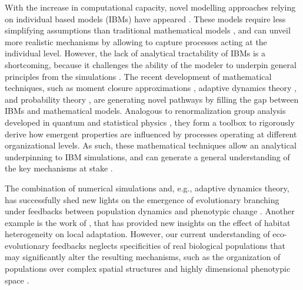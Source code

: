 With the increase in computational capacity, novel modelling approaches relying on individual based models (IBMs) have appeared \citep{deangelis2005individual}. These models require less simplifying assumptions than traditional mathematical models \citep{deangelis2005individual}, and can unveil more realistic mechanisms by allowing to capture processes acting at the individual level. However, the lack of analytical tractability of IBMs is a shortcoming, because it challenges the ability of the modeler to underpin general principles from the simulations \citep{Lion2016,May2004}.
% 
The recent development of mathematical techniques, such as moment closure approximations \citep{law1999moment,Gandhi2000,Nordbotten2020,Lion2016}, adaptive dynamics theory \citep{Metz1995}, and probability theory \citep{Champagnat2006}, are generating novel pathways by filling the gap between IBMs and mathematical models. 
% 
% 
Analogous to renormalization group analysis developed in quantum and statistical physics \citep{Sayama}, they form a toolbox to rigorously derive how emergent properties are influenced by processes operating at different organizational levels. As such, these mathematical techniques allow an analytical underpinning to IBM simulations, and can generate a general understanding of the key mechanisms at stake \citep{Lion2016}.

The combination of numerical simulations and, e.g., adaptive dynamics theory, has successfully shed new lights on the emergence of evolutionary branching under feedbacks between population dynamics and phenotypic change \citep{Dieckmann1999,Doebeli2003}.
%
Another example is the work of \cite{Meszena1997,Debarre2013, Mirrahimi2020}, that has provided new insights on the effect of habitat heterogeneity on local adaptation. 
% 
However, our current understanding of eco-evolutionary feedbacks neglects specificities of real biological populations that may significantly alter the resulting mechanisms, such as the organization of populations over complex spatial structures \citep{Nowak2001a} and highly dimensional phenotypic space \citep{Doebeli2010}.

